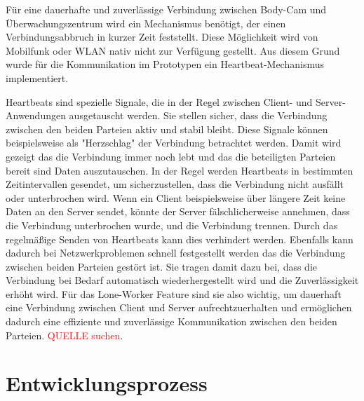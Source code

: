 \documentclass[thesis.tex]{subfiles}
\begin{document}
Für eine dauerhafte und zuverlässige Verbindung zwischen Body-Cam und Überwachungszentrum wird ein Mechanismus benötigt, der einen Verbindungsabbruch in kurzer Zeit feststellt.
Diese Möglichkeit wird von Mobilfunk oder WLAN nativ nicht zur Verfügung gestellt.
Aus diesem Grund wurde für die Kommunikation im Prototypen ein Heartbeat-Mechanismus implementiert.

Heartbeats sind spezielle Signale, die in der Regel zwischen Client- und Server-Anwendungen ausgetauscht werden.
Sie stellen sicher, dass die Verbindung zwischen den beiden Parteien aktiv und stabil bleibt.
Diese Signale können beispielsweise als "Herzschlag" der Verbindung betrachtet werden.
Damit wird gezeigt das die Verbindung immer noch lebt und das die beteiligten Parteien bereit sind Daten auszutauschen.
In der Regel werden Heartbeats in bestimmten Zeitintervallen gesendet, um sicherzustellen, dass die Verbindung nicht ausfällt oder unterbrochen wird.
Wenn ein Client beispielsweise über längere Zeit keine Daten an den Server sendet, könnte der Server fälschlicherweise annehmen, dass die Verbindung unterbrochen wurde, und die Verbindung trennen.
Durch das regelmäßige Senden von Heartbeats kann dies verhindert werden.
Ebenfalls kann dadurch bei Netzwerkproblemen schnell festgestellt werden das die Verbindung zwischen beiden Parteien gestört ist.
Sie tragen damit dazu bei, dass die Verbindung bei Bedarf automatisch wiederhergestellt wird und die Zuverlässigkeit erhöht wird.
Für das Lone-Worker Feature sind sie also wichtig, um dauerhaft eine Verbindung zwischen Client und Server aufrechtzuerhalten und ermöglichen dadurch eine effiziente und zuverlässige Kommunikation zwischen den beiden Parteien.
\textcolor{red}{QUELLE suchen}.

\section{Entwicklungsprozess}
\end{document}
